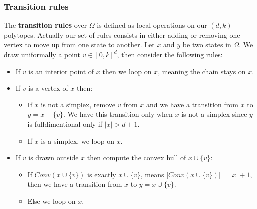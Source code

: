 \documentclass[11pt]{article}
\begin{document}
\subsubsection{Transition rules}

The \textbf{transition rules} over $\Omega$ is defined as local operations on our $(d,k)-$polytopes. Actually our set of rules consists in either adding or removing one vertex to move up from one state to another. Let $x$ and $y$ be two states in $\Omega$. We draw uniformally a point $v \in [0,k]^d$, then consider the following rules:

\begin{itemize}
  \item If $v$ is an interior point of $x$ then we loop on $x$, meaning the chain stays on $x$.
  \item If $v$ is a vertex of $x$ then:
  \begin{itemize}
    \item If $x$ is not a simplex, remove $v$ from $x$ and we have a transition from $x$ to $y=x - \{v\}$. We have this transition only when $x$ is not a simplex since $y$ is fulldimentional only if $|x|>d+1$.
    \item If $x$ is a simplex, we loop on $x$.
  \end{itemize}
  \item If $v$ is drawn outside $x$ then compute the convex hull of $x \cup \{v\}$:
  \begin{itemize}
    \item If $Conv(x\cup\{v\})$ is exactly $x\cup\{v\}$, means $|Conv(x \cup \{v\})| = |x| + 1$, then we have a transition from $x$ to $y = x \cup \{v\}$.
    \item Else we loop on $x$.
  \end{itemize}
\end{itemize}

\end{document}
